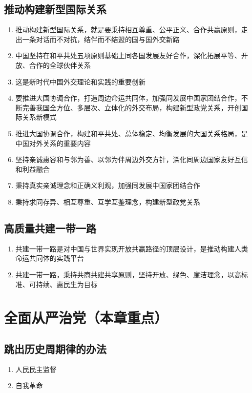 \documentclass{ctexart}
\numberwithin{figure}{section}
\numberwithin{equation}{section}
\begin{document}
    \subsection{推动构建新型国际关系}
    \begin{enumerate}
        \item 推动构建新型国际关系，就是要秉持相互尊重、公平正义、合作共赢原则，走出一条对话而不对抗，结伴而不结盟的国与国外交新路
        \item 中国坚持在和平共处五项原则基础上同各国发展友好合作，深化拓展平等、开放、合作的全球伙伴关系
        \item 这是新时代中国外交理论和实践的重要创新
        \item 要推进大国协调合作，打造周边命运共同体，加强同发展中国家团结合作，不断完善我国全方位、多层次、立体化的外交布局，构建新型政党关系，开创国际关系新模式
        \item 推进大国协调合作，构建和平共处、总体稳定、均衡发展的大国关系格局，是中国对外关系的重要内容
        \item 坚持亲诚惠容和与邻为善、以邻为伴周边外交方针，深化同周边国家友好互信和利益融合
        \item 秉持真实亲诚理念和正确义利观，加强同发展中国家团结合作
        \item 秉持求同存异、相互尊重、互学互鉴理念，构建新型政党关系
    \end{enumerate}
    \subsection{高质量共建一带一路}
    \begin{enumerate}
        \item 共建一带一路是对中国与世界实现开放共赢路径的顶层设计，是推动构建人类命运共同体的实践平台
        \item 共建一带一路，秉持共商共建共享原则，坚持开放、绿色、廉洁理念，以高标准、可持续、惠民生为目标
    \end{enumerate}
\section{全面从严治党（本章重点）}
    \subsection{跳出历史周期律的办法}
    \begin{enumerate}
        \item 人民民主监督
        \item 自我革命
    \end{enumerate}
\end{document}
